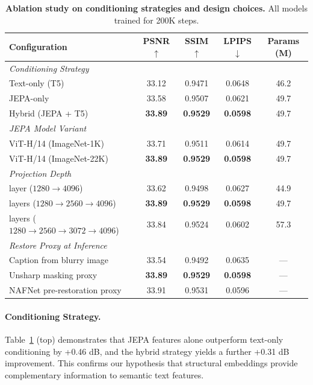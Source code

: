 \documentclass{article}
\begin{document}
\begin{table}[t]
\centering
\caption{\textbf{Ablation study on conditioning strategies and design choices.} All models trained for 200K steps.}
\label{tab:ablation}
\vspace{0.5em}
\begin{tabular}{@{}lcccc@{}}
\toprule
Configuration & PSNR $\uparrow$ & SSIM $\uparrow$ & LPIPS $\downarrow$ & Params (M) \\
\midrule
\multicolumn{5}{l}{\textit{Conditioning Strategy}} \\
\quad Text-only (T5) & 33.12 & 0.9471 & 0.0648 & 46.2 \\
\quad JEPA-only & 33.58 & 0.9507 & 0.0621 & 49.7 \\
\quad Hybrid (JEPA + T5) & \textbf{33.89} & \textbf{0.9529} & \textbf{0.0598} & 49.7 \\
\midrule
\multicolumn{5}{l}{\textit{JEPA Model Variant}} \\
\quad ViT-H/14 (ImageNet-1K) & 33.71 & 0.9511 & 0.0614 & 49.7 \\
\quad ViT-H/14 (ImageNet-22K) & \textbf{33.89} & \textbf{0.9529} & \textbf{0.0598} & 49.7 \\
\midrule
\multicolumn{5}{l}{\textit{Projection Depth}} \\
\quad 1 layer ($1280 \to 4096$) & 33.62 & 0.9498 & 0.0627 & 44.9 \\
\quad 2 layers ($1280 \to 2560 \to 4096$) & \textbf{33.89} & \textbf{0.9529} & \textbf{0.0598} & 49.7 \\
\quad 3 layers ($1280 \to 2560 \to 3072 \to 4096$) & 33.84 & 0.9524 & 0.0602 & 57.3 \\
\midrule
\multicolumn{5}{l}{\textit{Restore Proxy at Inference}} \\
\quad Caption from blurry image & 33.54 & 0.9492 & 0.0635 & --- \\
\quad Unsharp masking proxy & \textbf{33.89} & \textbf{0.9529} & \textbf{0.0598} & --- \\
\quad NAFNet pre-restoration proxy & 33.91 & 0.9531 & 0.0596 & --- \\
\bottomrule
\end{tabular}
\end{table}

\paragraph{Conditioning Strategy.}
Table~\ref{tab:ablation} (top) demonstrates that JEPA features alone outperform text-only conditioning by +0.46 dB, and the hybrid strategy yields a further +0.31 dB improvement. This confirms our hypothesis that structural embeddings provide complementary information to semantic text features.
\end{document}
